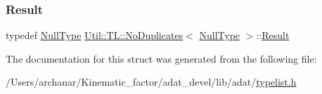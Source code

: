 \mbox{\label{structUtil_1_1TL_1_1NoDuplicates_3_01NullType_01_4_abb8d5323219cad8bdeef505d43773254}} 
\subsubsection{\texorpdfstring{Result}{Result}\hspace{0.1cm}{\footnotesize\ttfamily [2/2]}}
{\footnotesize\ttfamily typedef \mbox{\hyperlink{classUtil_1_1NullType}{Null\+Type}} \mbox{\hyperlink{structUtil_1_1TL_1_1NoDuplicates}{Util\+::\+T\+L\+::\+No\+Duplicates}}$<$ \mbox{\hyperlink{classUtil_1_1NullType}{Null\+Type}} $>$\+::\mbox{\hyperlink{structUtil_1_1TL_1_1NoDuplicates_3_01NullType_01_4_abb8d5323219cad8bdeef505d43773254}{Result}}}



The documentation for this struct was generated from the following file\+:\begin{DoxyCompactItemize}
\item 
/\+Users/archanar/\+Kinematic\+\_\+factor/adat\+\_\+devel/lib/adat/\mbox{\hyperlink{lib_2adat_2typelist_8h}{typelist.\+h}}\end{DoxyCompactItemize}
